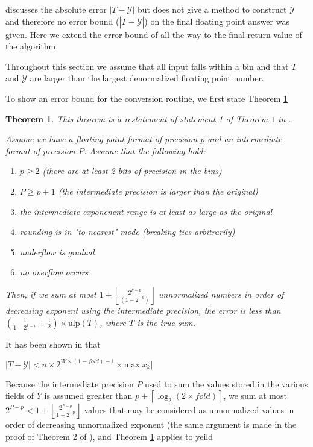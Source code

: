 \documentclass[12pt]{article}
\providecommand{\ceil}[1]{\left \lceil #1 \right \rceil }
\providecommand{\floor}[1]{\left \lfloor #1 \right \rfloor }
\providecommand{\max}{\ensuremath{\text{max}}}
\providecommand{\ulp}{\ensuremath{\text{ulp}}}
\theoremstyle{plain}
\newtheorem{thm}{Theorem}[section]
\begin{document}
    \cite{repsum} discusses the absolute error $|T - \mathcal{Y}|$ but does not give a method to construct $\overline{\mathcal{Y}}$ and therefore no error bound ($|T - \overline{\mathcal{Y}}|$) on the final floating point answer was given. Here we extend the error bound of \cite{repsum} all the way to the final return value of the algorithm.

    Throughout this section we assume that all input falls within a bin and that $T$ and $\mathcal{Y}$ are larger than the largest denormalized floating point number.

    To show an error bound for the conversion routine, we first state Theorem \ref{thm:sortsum}

    \begin{thm}
      This theorem is a restatement of statement 1 of Theorem $1$ in \cite{sortsum}.

      Assume we have a floating point format of precision $p$ and an intermediate format of precision $P$. Assume that the following hold:
      \begin{enumerate}
        \item $p \geq 2$ (there are at least 2 bits of precision in the bins)
        \item $P \geq p + 1$ (the intermediate precision is larger than the original)
        \item the intermediate exponenent range is at least as large as the original
        \item rounding is in "to nearest" mode (breaking ties arbitrarily)
        \item underflow is gradual
        \item no overflow occurs
      \end{enumerate}
      Then, if we sum at most $1 + \floor{\frac{2^{P - p}}{(1 - 2^{-p})}}$ unnormalized numbers in order of decreasing exponent using the intermediate precision, the error is less than $(\frac{1}{1 - 2^{1 - p}} + \frac{1}{2})\times \ulp(T)$, where $T$ is the true sum.
      \label{thm:sortsum}
    \end{thm}

    It has been shown in \cite{repsum} that

    $|T - \mathcal{Y}| < n \times 2^{W \times (1 - fold) - 1} \times \max|x_k|$

    Because the intermediate precision $P$ used to sum the values stored in the various fields of $Y$ is assumed greater than $p + \ceil{\log_2(2 \times fold)}$, we sum at most $2^{P - p} < 1 + \floor{\frac{2^{P - p}}{1 - 2^{-p}}}$ values that may be considered as unnormalized values in order of decreasing unnormalized exponent (the same argument is made in the proof of Theorem 2 of \cite{sortsum}), and Theorem \ref{thm:sortsum} applies to yeild
\end{document}
